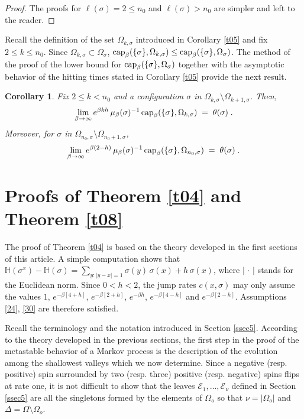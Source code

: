 \documentclass[reqno]{amsart}
\newtheorem{corollary}[theorem]{Corollary}
\begin{document}
\begin{proof}
The proofs for $\ell(\sigma)=2\le n_0$ and $\ell(\sigma)> n_0$ are
simpler and left to the reader.
\end{proof}

Recall the definition of the set $\Omega_{k,\sigma}$ introduced in
Corollary \ref{t05} and fix $2\le k\le n_0$. Since $\Omega_{k,\sigma}
\subset \Omega_{\sigma}$, ${{\rm cap}}_\beta(\{\sigma\} , \Omega_{k,\sigma})
\le {{\rm cap}}_\beta(\{\sigma\} , \Omega_{\sigma})$. The method of the proof
of the lower bound for ${{\rm cap}}_\beta(\{\sigma\} , \Omega_{\sigma})$
together with the asymptotic behavior of the hitting times stated in
Corollary \ref{t05} provide the next result.

\begin{corollary}
\label{t06}
Fix $2\le k<n_0$ and a configuration $\sigma$ in
$\Omega_{k,\sigma}\setminus \Omega_{k+1,\sigma}$. Then,
\begin{equation*}
\lim_{\beta\to\infty}  e^{\beta k h} \, \mu_\beta
(\sigma)^{-1} \, {{\rm cap}}_\beta(\{\sigma\} , \Omega_{k,\sigma}) \;=\; 
\theta(\sigma)\;.
\end{equation*}
Moreover, for $\sigma$ in $\Omega_{n_0,\sigma}\setminus
\Omega_{n_0+1,\sigma}$,
\begin{equation*}
\lim_{\beta\to\infty}  e^{\beta (2-h)} \, \mu_\beta
(\sigma)^{-1} \, {{\rm cap}}_\beta(\{\sigma\} , \Omega_{n_0,\sigma}) \;=\; 
\theta(\sigma)\;.
\end{equation*}
\end{corollary}

\section {Proofs of Theorem \ref{t04} and Theorem \ref{t08}}

The proof of Theorem \ref{t04} is based on the theory developed in
the first sections of this article.  A simple computation shows that
${{\mathbb H}}(\sigma^{x}) - {{\mathbb H}}(\sigma) = \sum_{y: |y-x|=1} \sigma(y)\,
\sigma(x) + h \, \sigma(x)$, where $|\,\cdot\,|$ stands for the
Euclidean norm. Since $0<h<2$, the jump rates $c (x,\sigma)$ may only
assume the values $1$, $e^{-\beta [4+h]}$, $e^{-\beta [2+h]}$,
$e^{-\beta h}$, $e^{-\beta [4-h]}$ and $e^{-\beta [2-h]}$. Assumptions
\eqref{24}, \eqref{30} are therefore satisfied.

Recall the terminology and the notation introduced in Section
\ref{ssec5}. According to the theory developed in the previous
sections, the first step in the proof of the metastable behavior of a
Markov process is the description of the evolution among the
shallowest valleys which we now determine.  Since a negative
(resp. positive) spin surrounded by two (resp. three) positive
(resp. negative) spins flips at rate one, it is not difficult to show
that the leaves ${{\mathcal E}}_1, \dots, {{\mathcal E}}_\nu$ defined in Section
\ref{ssec5} are all the singletons formed by the elements of
$\Omega_o$ so that $\nu = |\Omega_o|$ and $\Delta =
\Omega\setminus\Omega_o$.
\end{document}
